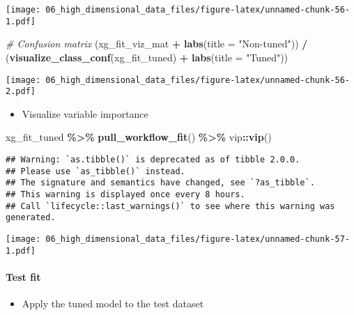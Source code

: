 \documentclass[
]{book}
\newenvironment{Shaded}{\begin{snugshade}}{\end{snugshade}}
\newcommand{\CommentTok}[1]{\textcolor[rgb]{0.56,0.35,0.01}{\textit{#1}}}
\newcommand{\DataTypeTok}[1]{\textcolor[rgb]{0.13,0.29,0.53}{#1}}
\newcommand{\KeywordTok}[1]{\textcolor[rgb]{0.13,0.29,0.53}{\textbf{#1}}}
\newcommand{\NormalTok}[1]{#1}
\newcommand{\OperatorTok}[1]{\textcolor[rgb]{0.81,0.36,0.00}{\textbf{#1}}}
\newcommand{\StringTok}[1]{\textcolor[rgb]{0.31,0.60,0.02}{#1}}
\providecommand{\tightlist}{%
  \setlength{\itemsep}{0pt}\setlength{\parskip}{0pt}}
\begin{document}
\texttt{[image: 06\_high\_dimensional\_data\_files/figure-latex/unnamed-chunk-56-1.pdf]}

\begin{Shaded}
\begin{Highlighting}[]
\CommentTok{\# Confusion matrix }
\NormalTok{(xg\_fit\_viz\_mat }\OperatorTok{+}\StringTok{ }\KeywordTok{labs}\NormalTok{(}\DataTypeTok{title =} \StringTok{"Non{-}tuned"}\NormalTok{)) }\OperatorTok{/}\StringTok{ }\NormalTok{(}\KeywordTok{visualize\_class\_conf}\NormalTok{(xg\_fit\_tuned) }\OperatorTok{+}\StringTok{ }\KeywordTok{labs}\NormalTok{(}\DataTypeTok{title =} \StringTok{"Tuned"}\NormalTok{))}
\end{Highlighting}
\end{Shaded}

\texttt{[image: 06\_high\_dimensional\_data\_files/figure-latex/unnamed-chunk-56-2.pdf]}

\begin{itemize}
\tightlist
\item
  Visualize variable importance
\end{itemize}

\begin{Shaded}
\begin{Highlighting}[]
\NormalTok{xg\_fit\_tuned }\OperatorTok{\%\textgreater{}\%}
\StringTok{  }\KeywordTok{pull\_workflow\_fit}\NormalTok{() }\OperatorTok{\%\textgreater{}\%}
\StringTok{  }\NormalTok{vip}\OperatorTok{::}\KeywordTok{vip}\NormalTok{()}
\end{Highlighting}
\end{Shaded}

\begin{verbatim}
## Warning: `as.tibble()` is deprecated as of tibble 2.0.0.
## Please use `as_tibble()` instead.
## The signature and semantics have changed, see `?as_tibble`.
## This warning is displayed once every 8 hours.
## Call `lifecycle::last_warnings()` to see where this warning was generated.
\end{verbatim}

\texttt{[image: 06\_high\_dimensional\_data\_files/figure-latex/unnamed-chunk-57-1.pdf]}

\hypertarget{test-fit-3}{%
\paragraph{Test fit}\label{test-fit-3}}

\begin{itemize}
\tightlist
\item
  Apply the tuned model to the test dataset
\end{itemize}
\end{document}
